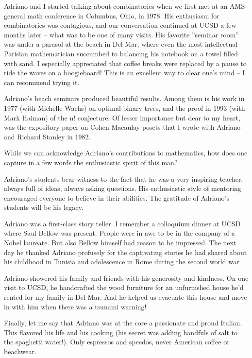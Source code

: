 \documentclass{notices}
\begin{document}
Adriano and I started talking about combinatorics when we first met at an AMS general math conference in Columbus, Ohio, in 1978. His enthusiasm for combinatorics was contagious, and our conversation continued at UCSD a few months later – what was to be one of many visits. His favorite ”seminar room” was under a parasol at the beach in Del Mar, where even the most intellectual Parisian mathematician succumbed to balancing his notebook on a towel filled with sand. I especially appreciated that coffee breaks were replaced by a pause to ride the waves on a boogieboard! This is an excellent way to clear one’s mind – I can recommend trying it.
 
Adriano’s beach seminars produced beautiful results. Among them is his work in 1977 (with Michelle Wachs) on optimal binary trees, and the proof in 1993 (with Mark Haiman) of the n! conjecture. Of lesser importance but dear to my heart, was the expository paper on Cohen-Macaulay posets that I wrote with Adriano and Richard Stanley in 1982. 
 
While we can acknowledge Adriano’s contributions to mathematics, how does one capture in a few words the enthusiastic spirit of this man?
 
Adriano’s students bear witness to the fact that he was a very inspiring teacher, always full of ideas, always asking questions.  His enthusiastic style of mentoring encouraged everyone to believe in their abilities. The gratitude of Adriano’s students will be his legacy.
 
Adriano was a first-class story teller. I remember a colloquium dinner at UCSD where Saul Bellow was present. People were in awe to be in the company of a Nobel laureate. But also Bellow himself had reason to be impressed.  The next day he thanked Adriano profusely for the captivating stories he had shared about his childhood in Tunisia and adolescence in Rome during the second world war.
 
Adriano showered his family and friends with his generosity and kindness. On one visit to UCSD, he handcrafted the wood furniture for an unfurnished house he’d rented for my family in Del Mar. And he helped us evacuate this house and move in with him when there was a tsunami warning! 
 
Finally, let me say that Adriano was at the core a passionate and proud Italian. This flavored his life and his cooking (his secret was adding handfuls of salt to the spaghetti water!).  Only espressos and speedos, never American coffee or beachwear.
 
\end{document}
